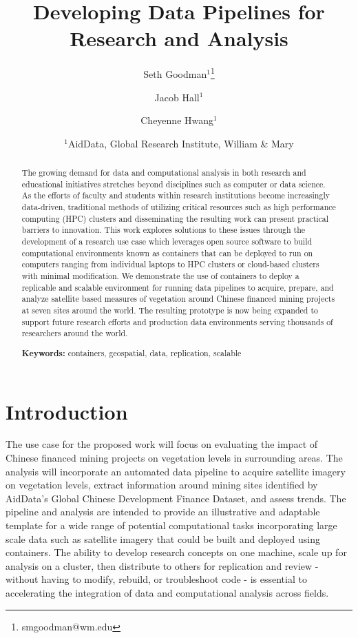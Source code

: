 \documentclass[a4paper]{article}
\title{Developing Data Pipelines for Research and Analysis}
\author{Seth Goodman$^1$\thanks{smgoodman@wm.edu} \and Jacob Hall$^1$ \and Cheyenne Hwang$^1$}
\date{
    $^1$AidData, Global Research Institute, William \& Mary \\ 
}
\begin{document}
\maketitle


\begin{abstract}

The growing demand for data and computational analysis in both research and educational initiatives stretches beyond disciplines such as computer or data science. As the efforts of faculty and students within research institutions become increasingly data-driven, traditional methods of utilizing critical resources such as high performance computing (HPC) clusters and disseminating the resulting work can present practical barriers to innovation. This work explores solutions to these issues through the development of a research use case which leverages open source software to build computational environments known as containers that can be deployed to run on computers ranging from individual laptops to HPC clusters or cloud-based clusters with minimal modification. We demonstrate the use of containers to deploy a replicable and scalable environment for running data pipelines to acquire, prepare, and analyze satellite based measures of vegetation around Chinese financed mining projects at seven sites around the world. The resulting prototype is now being expanded to support future research efforts and production data environments serving thousands of researchers around the world.

\noindent\textbf{Keywords:} containers, geospatial, data, replication, scalable
\end{abstract}


\section{Introduction}
	
The use case for the proposed work will focus on evaluating the impact of Chinese financed mining projects on vegetation levels in surrounding areas. The analysis will incorporate an automated data pipeline to acquire satellite imagery on vegetation levels, extract information around mining sites identified by AidData's Global Chinese Development Finance Dataset, and assess trends. The pipeline and analysis are intended to provide an illustrative and adaptable template for a wide range of potential computational tasks incorporating large scale data such as satellite imagery that could be built and deployed using containers. The ability to develop research concepts on one machine, scale up for analysis on a cluster, then distribute to others for replication and review - without having to modify, rebuild, or troubleshoot code - is essential to accelerating the integration of data and computational analysis across fields.
\end{document}
